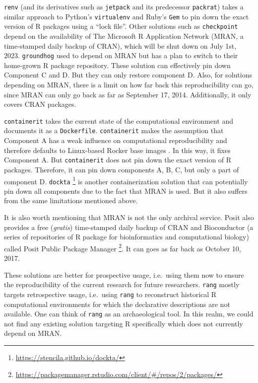\documentclass[
  10pt,
  letterpaper,
]{article}
\begin{document}
\texttt{renv} \citep{renvrpkg} (and its derivatives such as
\texttt{jetpack} and its predecessor \texttt{packrat}) takes a similar
approach to Python's \texttt{virtualenv} and Ruby's \texttt{Gem} to pin
down the exact version of R packages using a ``lock file''. Other
solutions such as \texttt{checkpoint} \citep{checkpointrpkg} depend on
the availability of The Microsoft R Application Network (MRAN, a
time-stamped daily backup of CRAN), which will be shut down on July 1st,
2023. \texttt{groundhog} \citep{groundhogrpkg} used to depend on MRAN
but has a plan to switch to their home-grown R package repository. These
solution can effectively pin down Component C and D. But they can only
restore component D. Also, for solutions depending on MRAN, there is a
limit on how far back this reproducibility can go, since MRAN can only
go back as far as September 17, 2014. Additionally, it only covers CRAN
packages.

\texttt{containerit} \citep{nuest:2019} takes the current state of the
computational environment and documents it as a \texttt{Dockerfile}.
\texttt{containerit} makes the assumption that Component A has a weak
influence on computational reproducibility and therefore defaults to
Linux-based Rocker base images \citep{boettiger:2017:IR}. In this way,
it fixes Component A. But \texttt{containerit} does not pin down the
exact version of R packages. Therefore, it can pin down components A, B,
C, but only a part of component D. \texttt{dockta} \footnote{\url{https://stencila.github.io/dockta/}}
is another containerization solution that can potentially pin down all
components due to the fact that MRAN is used. But it also suffers from
the same limitations mentioned above.

It is also worth mentioning that MRAN is not the only archival service.
Posit also provides a free (\emph{gratis}) time-stamped daily backup of
CRAN and Bioconductor (a series of repositories of R package for
bioinformatics and computational biology) called Posit Public Package
Manager \footnote{\url{https://packagemanager.rstudio.com/client/\#/repos/2/packages/}}.
It can goes as far back as October 10, 2017.

These solutions are better for prospective usage, i.e.~using them now to
ensure the reproducibility of the current research for future
researchers. \texttt{rang} mostly targets retrospective usage,
i.e.~using \texttt{rang} to reconstruct historical R computational
environments for which the declarative descriptions are not available.
One can think of \texttt{rang} as an archaeological tool. In this realm,
we could not find any existing solution targeting R specifically which
does not currently depend on MRAN.
\end{document}
